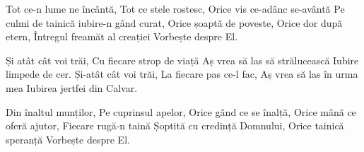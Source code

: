 \beginverse
Tot ce-n lume ne încântă,
Tot ce stele rostesc,
Orice vis ce-adânc se-avântă
Pe culmi de tainică iubire-n gând curat,
Orice șoaptă de poveste,
Orice dor după etern,
Întregul freamăt al creației
Vorbește despre El.
\endverse

\beginchorus
Și atât cât voi trăi,
Cu fiecare strop de viață
Aș vrea să las să strălucească
Iubire limpede de cer.
Și-atât cât voi trăi,
La fiecare pas ce-l fac,
Aș vrea să las în urma mea
Iubirea jertfei din Calvar.
\endchorus

\beginverse
Din înaltul munților,
Pe cuprinsul apelor,
Orice gând ce se înalță,
Orice mână ce oferă ajutor,
Fiecare rugă-n taină
Șoptită cu credință Domnului,
Orice tainică speranță
Vorbește despre El.
\endverse
\endsong